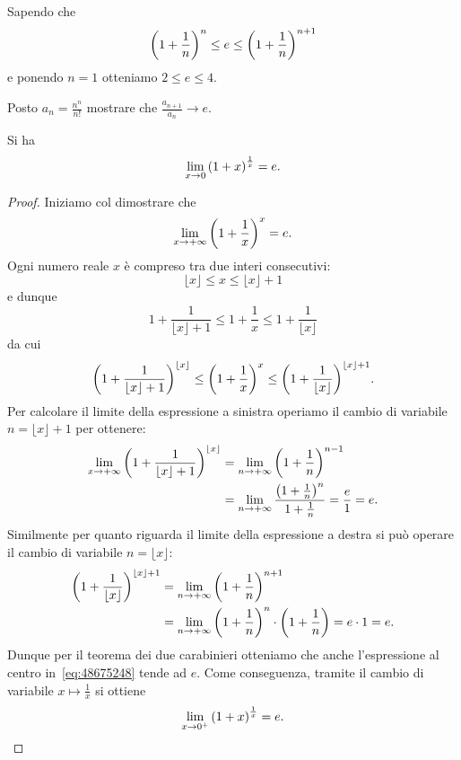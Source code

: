 Sapendo che
\[
  {\left( 1+\frac 1 n \right)}^n \le e \le {\left( 1+\frac 1 n \right)}^{n+1}
\]
e ponendo $n=1$ otteniamo $2\le e \le 4$.

\begin{exercise}\label{ex:4876765}
Posto $a_n = \frac{n^n}{n!}$ mostrare che $\frac{a_{n+1}}{a_n} \to e$.
\end{exercise}


\begin{theorem}
%
Si ha 
\[
\lim_{x\to 0}  {\left( 1 + x \right)}^{\frac 1 {x}} = e.
\]
\end{theorem}
%
\begin{proof}
  Iniziamo col dimostrare che 
  \begin{equation}\label{eq:2373793}
    \lim_{x\to +\infty} {\left( 1+\frac 1 x \right)}^x = e.
  \end{equation}
  Ogni numero reale $x$ è compreso tra due interi consecutivi:
  \[
      \lfloor x \rfloor \le x \le \lfloor x\rfloor + 1
  \]
  e dunque
  \[
    1+\frac{1}{\lfloor x\rfloor +1 } 
    \le 1 + \frac 1 x 
    \le 1 + \frac 1 {\lfloor x\rfloor} 
  \]
  da cui 
  \begin{equation}\label{eq:48675248}
    {\left( 1+\frac{1}{\lfloor x\rfloor +1 } \right)}^{\lfloor x\rfloor} 
    \le {\left( 1 + \frac 1 x  \right)}^x
    \le {\left( 1 + \frac 1 {\lfloor x\rfloor} \right)}^{\lfloor x\rfloor +1}. 
  \end{equation}
  Per calcolare il limite della espressione a sinistra 
  operiamo il cambio di variabile $n=\lfloor x\rfloor + 1$ per 
  ottenere:
  \begin{align*}
  \lim_{x\to+\infty} {\left( 1+\frac{1}{\lfloor x\rfloor +1 } \right)}^{\lfloor x\rfloor}
  &= \lim_{n\to +\infty} {\left( 1+\frac 1 n \right)}^{n-1}\\
  &= \lim_{n\to +\infty} \frac{{\left( 1+\frac 1 n \right)}^{n}}{1+\frac 1 n}
   = \frac{e}{1} = e.
  \end{align*}
  Similmente per quanto riguarda il limite della espressione a destra 
  si può operare il cambio di variabile $n=\lfloor x\rfloor$:
  \begin{align*}
    {\left( 1 + \frac 1 {\lfloor x\rfloor} \right)}^{\lfloor x\rfloor +1}
    &= \lim_{n\to+\infty} {\left( 1+\frac 1 n \right)}^{n+1} \\
    &= \lim_{n\to+\infty} {\left( 1+\frac 1 n \right)}^n 
    \cdot {\left( 1 + \frac 1 n \right)} 
    = e \cdot 1 = e.
  \end{align*}
  Dunque per il teorema dei due carabinieri otteniamo
  che anche l'espressione 
  al centro in~\eqref{eq:48675248} tende ad $e$.
  Come conseguenza, tramite il cambio di variabile $x\mapsto \frac 1 x$
  si ottiene 
  \[
  \lim_{x\to 0^+}{\left( 1+x \right)}^{\frac 1 x} = e.  
  \]


\end{proof}
